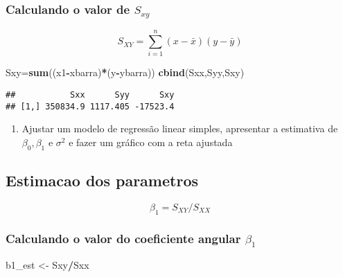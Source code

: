 \documentclass[
]{article}
\newenvironment{Shaded}{\begin{snugshade}}{\end{snugshade}}
\newcommand{\KeywordTok}[1]{\textcolor[rgb]{0.13,0.29,0.53}{\textbf{#1}}}
\newcommand{\NormalTok}[1]{#1}
\newcommand{\OperatorTok}[1]{\textcolor[rgb]{0.81,0.36,0.00}{\textbf{#1}}}
\newcommand{\StringTok}[1]{\textcolor[rgb]{0.31,0.60,0.02}{#1}}
\providecommand{\tightlist}{%
  \setlength{\itemsep}{0pt}\setlength{\parskip}{0pt}}
\begin{document}
\hypertarget{calculando-o-valor-de-s_xy}{%
\subsubsection{\texorpdfstring{Calculando o valor de
\(S_{xy}\)}{Calculando o valor de S\_\{xy\}}}\label{calculando-o-valor-de-s_xy}}

\[S_{XY} =  \sum_{i=1}^n (x - \bar{x})(y - \bar{y})\]

\begin{Shaded}
\begin{Highlighting}[]
\NormalTok{Sxy=}\KeywordTok{sum}\NormalTok{((x1}\OperatorTok{-}\NormalTok{xbarra)}\OperatorTok{*}\NormalTok{(y}\OperatorTok{-}\NormalTok{ybarra))}
\KeywordTok{cbind}\NormalTok{(Sxx,Syy,Sxy)}
\end{Highlighting}
\end{Shaded}

\begin{verbatim}
##           Sxx      Syy      Sxy
## [1,] 350834.9 1117.405 -17523.4
\end{verbatim}

\begin{enumerate}
\def\labelenumi{\arabic{enumi}.}
\setcounter{enumi}{1}
\tightlist
\item
  Ajustar um modelo de regressão linear simples, apresentar a estimativa
  de \(\beta_0, \beta_1\) e \(\sigma^2\) e fazer um gráfico com a reta
  ajustada
\end{enumerate}

\hypertarget{estimacao-dos-parametros}{%
\subsection{Estimacao dos parametros}\label{estimacao-dos-parametros}}

\[\beta_1 = S_{XY}/S_{XX}\]

\hypertarget{calculando-o-valor-do-coeficiente-angular-beta_1}{%
\subsubsection{\texorpdfstring{Calculando o valor do coeficiente angular
\(\beta_1\)}{Calculando o valor do coeficiente angular \textbackslash beta\_1}}\label{calculando-o-valor-do-coeficiente-angular-beta_1}}

\begin{Shaded}
\begin{Highlighting}[]
\NormalTok{b1_est <-}\StringTok{ }\NormalTok{Sxy}\OperatorTok{/}\NormalTok{Sxx}
\end{Highlighting}
\end{Shaded}
\end{document}
